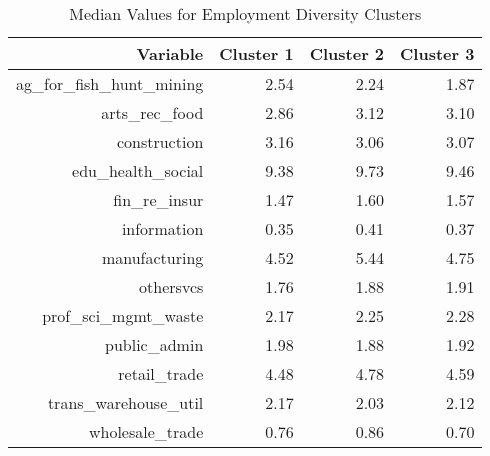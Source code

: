 \begin{table}[ht]
    \centering
    \caption{Median Values for Employment Diversity Clusters}
    \label{tab:emp}
    \begin{tabular}{|r| r| r| r|}
        \hline
        Variable & Cluster 1 & Cluster 2 & Cluster 3 \\ 
        \hline
        ag\_for\_fish\_hunt\_mining & 2.54 & 2.24 & 1.87 \\ 
        \hline
        arts\_rec\_food & 2.86 & 3.12 & 3.10 \\ 
        \hline
        construction & 3.16 & 3.06 & 3.07 \\ 
        \hline
        edu\_health\_social & 9.38 & 9.73 & 9.46 \\ 
        \hline
        fin\_re\_insur & 1.47 & 1.60 & 1.57 \\ 
        \hline
        information & 0.35 & 0.41 & 0.37 \\ 
        \hline
        manufacturing & 4.52 & 5.44 & 4.75 \\ 
        \hline
        othersvcs & 1.76 & 1.88 & 1.91 \\ 
        \hline
        prof\_sci\_mgmt\_waste & 2.17 & 2.25 & 2.28 \\ 
        \hline
        public\_admin & 1.98 & 1.88 & 1.92 \\ 
        \hline
        retail\_trade & 4.48 & 4.78 & 4.59 \\ 
        \hline
        trans\_warehouse\_util & 2.17 & 2.03 & 2.12 \\ 
        \hline
        wholesale\_trade & 0.76 & 0.86 & 0.70 \\ 
        \hline
    \end{tabular}
\end{table}